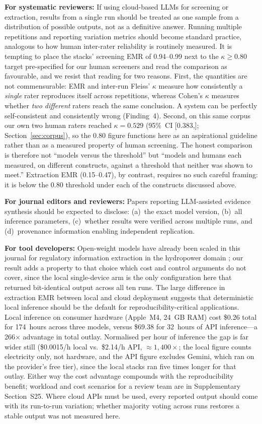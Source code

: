 \documentclass[preprint,review,12pt,authoryear]{elsarticle}
\newcommand{\ci}[2]{[#1,\;#2]}
\begin{document}
\textbf{For systematic reviewers:}
If using cloud-based LLMs for screening or extraction, results from a single run should be treated as one sample from a distribution of possible outputs, not as a definitive answer.
Running multiple repetitions and reporting variation metrics should become standard practice, analogous to how human inter-rater reliability is routinely measured.
It is tempting to place the stacks' screening EMR of 0.94--0.99 next to the $\kappa{\geq}0.80$ target pre-specified for our human screeners and read the comparison as favourable, and we resist that reading for two reasons.
First, the quantities are not commensurable: EMR and inter-run Fleiss' $\kappa$ measure how consistently a \emph{single} rater reproduces itself across repetitions, whereas Cohen's $\kappa$ measures whether \emph{two different} raters reach the same conclusion. A system can be perfectly self-consistent and consistently wrong (Finding~4).
Second, on this same corpus our own two human raters reached $\kappa{=}0.529$ (95\%~CI \ci{0.383}{0.674}; Section~\ref{sec:corpus}), so the $0.80$ figure functions here as an aspirational guideline rather than as a measured property of human screening. The honest comparison is therefore not ``models versus the threshold'' but ``models and humans each measured, on different constructs, against a threshold that neither was shown to meet.''
Extraction EMR (0.15--0.47), by contrast, requires no such careful framing: it is below the 0.80 threshold under each of the constructs discussed above.

\textbf{For journal editors and reviewers:}
Papers reporting LLM-assisted evidence synthesis should be expected to disclose: (a)~the exact model version, (b)~all inference parameters, (c)~whether results were verified across multiple runs, and (d)~provenance information enabling independent replication.

\textbf{For tool developers:}
Open-weight models have already been scaled in this journal for regulatory information extraction in the hydropower domain \citep{yoon2026hydropower}; our result adds a property to that choice which cost and control arguments do not cover, since the local single-device arm is the only configuration here that returned bit-identical output across all ten runs.
The large difference in extraction EMR between local and cloud deployment suggests that deterministic local inference should be the default for reproducibility-critical applications.
Local inference on consumer hardware (Apple~M4, 24~GB RAM) cost \$0.26 total for 174~hours across three models, versus \$69.38 for 32~hours of API inference---a 266$\times$ advantage in total outlay. Normalised per hour of inference the gap is far wider still (\$0.0015/h local vs.\ \$2.14/h API, ${\approx}1{,}400\times$; the local figure counts electricity only, not hardware, and the API figure excludes Gemini, which ran on the provider's free tier), since the local stacks ran five times longer for that outlay. Either way the cost advantage compounds with the reproducibility benefit; workload and cost scenarios for a review team are in Supplementary Section~S25.
Where cloud APIs must be used, every reported output should come with its run-to-run variation; whether majority voting across runs restores a stable output was not measured here.
\end{document}
